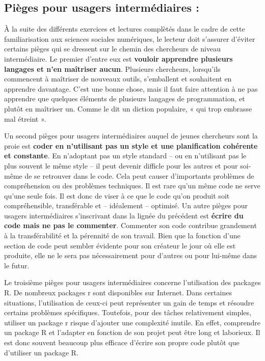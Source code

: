\documentclass[
  letterpaper,
  DIV=11,
  numbers=noendperiod]{scrreprt}
\begin{document}
\hypertarget{piuxe8ges-pour-usagers-intermuxe9diaires}{%
\subsection{Pièges pour usagers intermédiaires
:}\label{piuxe8ges-pour-usagers-intermuxe9diaires}}

À la suite des différents exercices et lectures complètés dans le cadre
de cette familiarisation aux sciences sociales numériques, le lecteur
doit s'assurer d'éviter certains pièges qui se dressent sur le chemin
des chercheurs de niveau intermédiaire. Le premier d'entre eux est
\textbf{vouloir apprendre plusieurs langages et n'en maîtriser aucun}.
Plusieurs chercheurs, lorsqu'ils commencent à maîtriser de nouveaux
outils, s'emballent et souhaitent en apprendre davantage. C'est une
bonne chose, mais il faut faire attention à ne pas apprendre que
quelques éléments de plusieurs langages de programmation, et plutôt en
maîtriser un. Comme le dit un diction populaire, « qui trop embrasse mal
étreint ».

Un second pièges pour usagers intermédiaires auquel de jeunes chercheurs
sont la proie est \textbf{coder en n'utilisant pas un style et une
planification cohérente et constante}. En n'adoptant pas un style
standard -- ou en n'utilisant pas le plus souvent le même style -- il
peut devenir difficle pour les autres et pour soi-même de se retrouver
dans le code. Cela peut causer d'importants problèmes de compréhension
ou des problèmes techniques. Il est rare qu'un même code ne serve qu'une
seule fois. Il est donc de viser à ce que le code qu'on produit soit
compréhensible, transférable et -- idéalement -- optimisé. Un autre
pièges pour usagers intermédiaires s'inscrivant dans la lignée du
précédent est \textbf{écrire du code mais ne pas le commenter}.
Commenter son code contribue grandement à la transférabilité et la
pérennité de son travail. Bien que la fonction d'une section de code
peut sembler évidente pour son créateur le jour où elle est produite,
elle ne le sera pas nécessairement pour d'autres ou pour lui-même dans
le futur.

Le troisième pièges pour usagers intermédiaires concerne l'utilisation
des packages R. De nombreux packages r sont disponibles sur Internet.
Dans certaines situations, l'utilisation de ceux-ci peut représenter un
gain de temps et résoudre certains problèmes spécifiques. Toutefois,
pour des tâches relativement simples, utiliser un package r risque
d'ajouter une complexité inutile. En effet, comprendre un package R et
l'adapter en fonction de son projet peut être long et laborieux. Il est
donc souvent beaucoup plus efficace d'écrire son propre code plutôt que
d'utiliser un package R.
\end{document}
